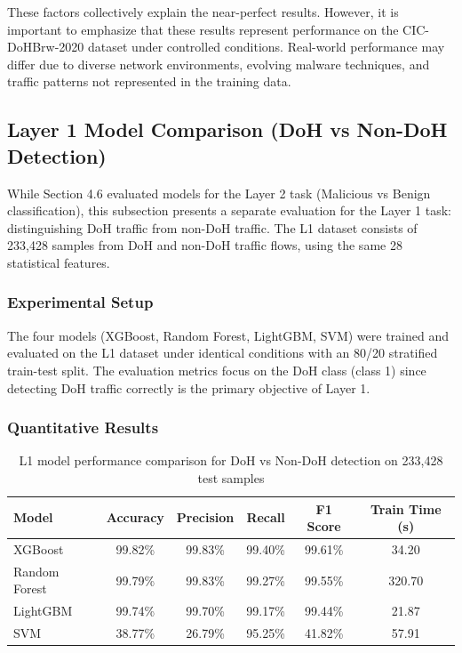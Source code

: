 \documentclass[../Main.tex]{subfiles}
\begin{document}
These factors collectively explain the near-perfect results. However, it is important to emphasize that these results represent performance on the CIC-DoHBrw-2020 dataset under controlled conditions. Real-world performance may differ due to diverse network environments, evolving malware techniques, and traffic patterns not represented in the training data.

\subsection{Layer 1 Model Comparison (DoH vs Non-DoH Detection)}
\label{section:4.6.7}

While Section 4.6 evaluated models for the Layer 2 task (Malicious vs Benign classification), this subsection presents a separate evaluation for the Layer 1 task: distinguishing DoH traffic from non-DoH traffic. The L1 dataset consists of 233,428 samples from DoH and non-DoH traffic flows, using the same 28 statistical features.

\subsubsection{Experimental Setup}

The four models (XGBoost, Random Forest, LightGBM, SVM) were trained and evaluated on the L1 dataset under identical conditions with an 80/20 stratified train-test split. The evaluation metrics focus on the DoH class (class 1) since detecting DoH traffic correctly is the primary objective of Layer 1.

\subsubsection{Quantitative Results}

\begin{table}[H]
\centering
\small
\begin{tabular}{|l|c|c|c|c|c|}
\hline
\textbf{Model} & \textbf{Accuracy} & \textbf{Precision} & \textbf{Recall} & \textbf{F1 Score} & \textbf{Train Time (s)} \\
\hline
XGBoost       & 99.82\% & 99.83\% & 99.40\% & 99.61\% & 34.20 \\
Random Forest & 99.79\% & 99.83\% & 99.27\% & 99.55\% & 320.70 \\
LightGBM      & 99.74\% & 99.70\% & 99.17\% & 99.44\% & 21.87 \\
SVM           & 38.77\% & 26.79\% & 95.25\% & 41.82\% & 57.91 \\
\hline
\end{tabular}
\caption{L1 model performance comparison for DoH vs Non-DoH detection on 233,428 test samples}
\label{tab:l1_model_comparison}
\end{table}
\end{document}
